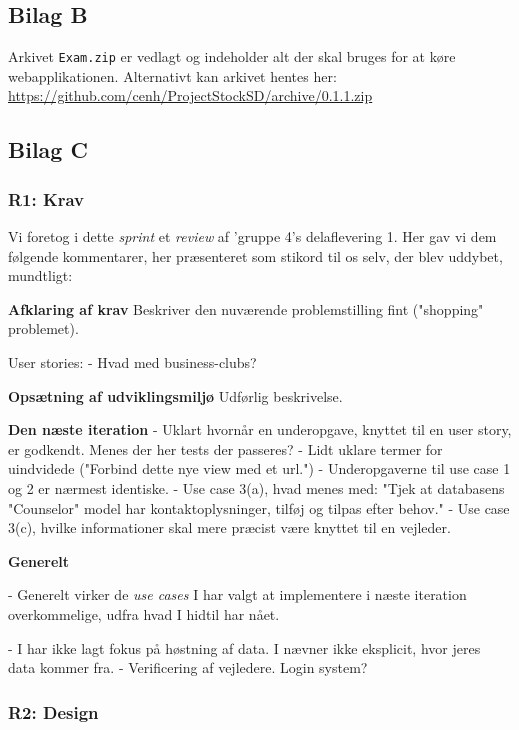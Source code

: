 \documentclass[12pt]{article}
\begin{document}
\subsection{Bilag B}
\label{sec:bilagB}
Arkivet \texttt{Exam.zip} er vedlagt og indeholder alt der skal bruges for at køre webapplikationen.
Alternativt kan arkivet hentes her:\\
\url{https://github.com/cenh/ProjectStockSD/archive/0.1.1.zip}


\subsection{Bilag C}
\label{sec:bilagC}
\subsubsection{R1: Krav}
Vi foretog i dette \textit{sprint} et \textit{review} af 'gruppe 4's delaflevering 1. Her gav vi dem følgende kommentarer, her præsenteret som stikord til os selv, der blev uddybet, mundtligt:

\textbf{Afklaring af krav}
Beskriver den nuværende problemstilling fint ("shopping" problemet).

User stories:
- Hvad med business-clubs?

\textbf{Opsætning af udviklingsmiljø}
Udførlig beskrivelse.

\textbf{Den næste iteration}
- Uklart hvornår en underopgave, knyttet til en user story, er godkendt. Menes der her tests der passeres?
- Lidt uklare termer for uindvidede ("Forbind dette nye view med et url.")
- Underopgaverne til use case 1 og 2 er nærmest identiske.
- Use case 3(a), hvad menes med: "Tjek at databasens "Counselor" model har kontaktoplysninger, tilføj og tilpas efter behov."
- Use case 3(c), hvilke informationer skal mere præcist være knyttet til en vejleder.

\textbf{Generelt}

- Generelt virker de \textit{use cases} I har valgt at implementere i næste iteration overkommelige, udfra hvad I hidtil har nået.

- I har ikke lagt fokus på høstning af data. I nævner ikke eksplicit, hvor jeres data kommer fra.
- Verificering af vejledere. Login system?



\subsubsection{R2: Design}
\end{document}
